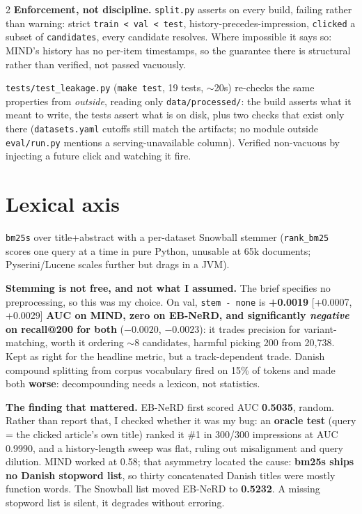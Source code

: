 \documentclass[10pt,a4paper]{article}
\newcommand{\ci}[2]{{\scriptsize[#1,\,#2]}}
\begin{document}
\begin{multicols}{2}
\textbf{Enforcement, not discipline.} \texttt{split.py} asserts on every build, failing rather than
warning: strict \texttt{train < val < test}, history-precedes-impression, \texttt{clicked} a subset
of \texttt{candidates}, every candidate resolves. Where impossible it says so: MIND's history has no
per-item timestamps, so the guarantee there is structural rather than verified, not passed vacuously.

\texttt{tests/test\_leakage.py} (\texttt{make test}, 19 tests, ${\sim}$20s) re-checks the same
properties from \emph{outside}, reading only \texttt{data/processed/}: the build asserts what it
meant to write, the tests assert what is on disk, plus two checks that exist only there
(\texttt{datasets.yaml} cutoffs still match the artifacts; no module outside \texttt{eval/run.py}
mentions a serving-unavailable column). Verified non-vacuous by injecting a future click and watching
it fire.

\section{Lexical axis}

\texttt{bm25s} over title+abstract with a per-dataset Snowball stemmer (\texttt{rank\_bm25} scores one
query at a time in pure Python, unusable at 65k documents; Pyserini/Lucene scales further but drags in
a JVM).

\textbf{Stemming is not free, and not what I assumed.} The brief specifies no preprocessing, so this
was my choice. On val, \texttt{stem - none} is \textbf{+0.0019} \ci{+0.0007}{+0.0029} \textbf{AUC on
MIND, zero on EB-NeRD, and significantly \emph{negative} on recall@200 for both} ($-0.0020$,
$-0.0023$): it trades precision for variant-matching, worth it ordering ${\sim}8$ candidates, harmful
picking 200 from 20,738. Kept as right for the headline metric, but a track-dependent trade. Danish
compound splitting from corpus vocabulary fired on 15\% of tokens and made both \textbf{worse}:
decompounding needs a lexicon, not statistics.

\textbf{The finding that mattered.} EB-NeRD first scored AUC \textbf{0.5035}, random. Rather than
report that, I checked whether it was my bug: an \textbf{oracle test} (query = the clicked article's
own title) ranked it \#1 in 300/300 impressions at AUC 0.9990, and a history-length sweep was flat,
ruling out misalignment and query dilution. MIND worked at 0.58; that asymmetry located the cause:
\textbf{bm25s ships no Danish stopword list}, so thirty concatenated Danish titles were mostly
function words. The Snowball list moved EB-NeRD to \textbf{0.5232}. A missing stopword list is silent,
it degrades without erroring.


\end{multicols}
\end{document}
